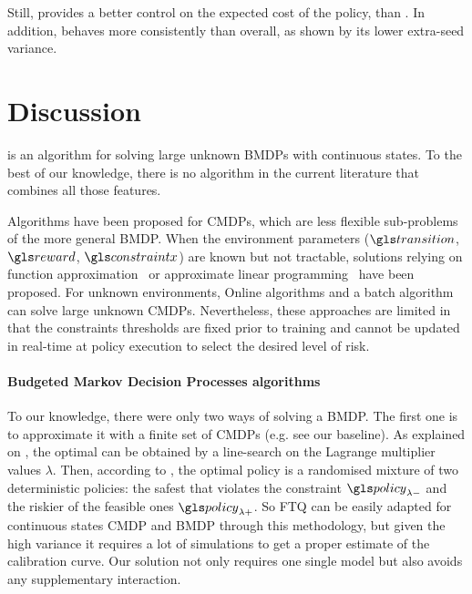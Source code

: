 Still, \BFTQ provides a better control on the expected cost of the policy, than \FTQl. In addition, \BFTQ behaves more consistently than \FTQl overall, as shown by its lower extra-seed variance.


\section{Discussion}
\label{subsec:discussions}
 is an algorithm for solving large unknown \glspl{BMDP} with continuous states. To the best of our knowledge, there is no algorithm in the current literature that combines all those features.

Algorithms have been proposed for \glspl{CMDP}, which are less flexible sub-problems of the more general \gls{BMDP}. When the environment parameters ($\Ps$, $\R$, $\constraint$) are known but not tractable, solutions relying on function approximation~\citep{Undurti} or approximate linear programming~\citep{Poupart2015} have been proposed. For unknown environments, Online algorithms \citep{Geibel2005, Abe2010,AchiamHTA17,ChowGJP15} and a batch algorithm \citep{Thomas2015, Petrik2016, Laroche2019,Le2019} can solve large unknown \glspl{CMDP}. Nevertheless, these approaches are limited in that the constraints thresholds are fixed prior to training and cannot be updated in real-time at policy execution to select the desired level of risk.

\paragraph{Budgeted Markov Decision Processes algorithms}
To our knowledge, there were only two ways of solving a \gls{BMDP}. The first one is to approximate it with a finite set of \glspl{CMDP} (e.g. see our \FTQl baseline). As explained on , the optimal  can be obtained by a line-search on the Lagrange multiplier values $\lambda$. Then, according to \citet[Theorem 4.4]{BEUTLER1985236}, the optimal policy is a randomised mixture of two deterministic policies: the safest  that violates the constraint $\policy_{\lambda-}$ and the riskier of the feasible ones $\policy_{\lambda+}$. So \gls{FTQ} can be easily adapted for continuous states \gls{CMDP} and \gls{BMDP} through this methodology, but given the high variance it requires a lot of simulations to get a proper estimate of the calibration curve. Our solution not only requires one single model but also avoids any supplementary interaction.

